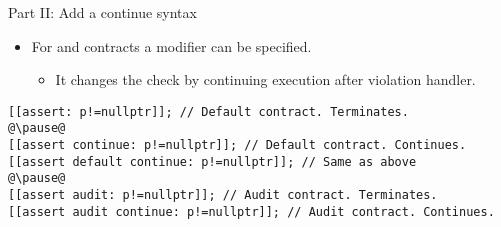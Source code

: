 \begin{frame}[t,fragile]{Part II: Add a continue syntax}
\begin{itemize}
  \item For  and  contracts a  modifier
        can be specified.
    \begin{itemize}
      \item It changes the check by continuing execution after violation handler.
    \end{itemize}
\end{itemize}
	\begin{lstlisting}[escapechar=@]
[[assert: p!=nullptr]]; // Default contract. Terminates.
@\pause@
[[assert continue: p!=nullptr]]; // Default contract. Continues.
[[assert default continue: p!=nullptr]]; // Same as above
@\pause@
[[assert audit: p!=nullptr]]; // Audit contract. Terminates.
[[assert audit continue: p!=nullptr]]; // Audit contract. Continues.
\end{lstlisting}
\end{frame}
